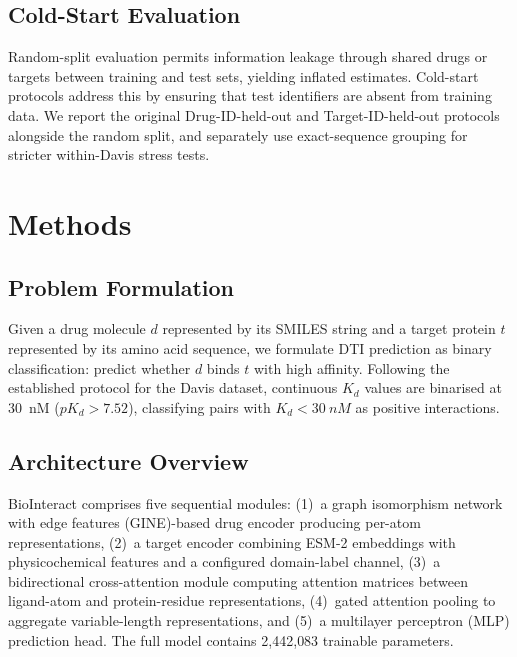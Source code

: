 \documentclass[fleqn,10pt]{wlscirep}
\begin{document}
\subsection{Cold-Start Evaluation}

Random-split evaluation permits information leakage through shared drugs or
targets between training and test sets, yielding inflated
estimates.\cite{huang2021therapeutics}  Cold-start protocols address this by
ensuring that test identifiers are absent from training data. We report the
original Drug-ID-held-out and Target-ID-held-out protocols alongside the random
split, and separately use exact-sequence grouping for stricter within-Davis
stress tests.

\section{Methods}
\label{sec:methods}

\subsection{Problem Formulation}

Given a drug molecule $d$ represented by its SMILES string and a target protein
$t$ represented by its amino acid sequence, we formulate DTI prediction as
binary classification: predict whether $d$ binds $t$ with high affinity.
Following the established protocol for the Davis
dataset,\cite{davis2011comprehensive} continuous $K_d$ values are binarised
at \SI{30}{nM} ($pK_d > 7.52$), classifying pairs with $K_d < \SI{30}{nM}$ as
positive interactions.

\subsection{Architecture Overview}

BioInteract comprises five sequential modules:
(1)~a graph isomorphism network with edge features (GINE)-based drug encoder producing per-atom representations,
(2)~a target encoder combining ESM-2 embeddings with physicochemical features
and a configured domain-label channel,
(3)~a bidirectional cross-attention module computing attention matrices between
ligand-atom and protein-residue representations,
(4)~gated attention pooling to aggregate variable-length representations, and
(5)~a multilayer perceptron (MLP) prediction head.
The full model contains 2{,}442{,}083 trainable parameters.
\end{document}
